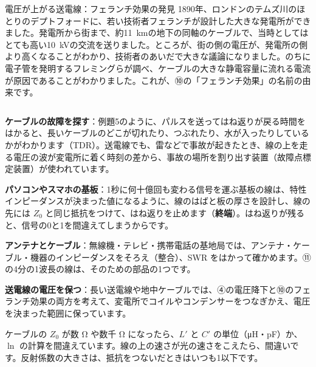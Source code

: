 \begin{column}{電圧が上がる送電線：フェランチ効果の発見}
1890年、ロンドンのテムズ川のほとりのデプトフォードに、若い技術者フェランチが設計した大きな発電所ができました。発電所から街まで、約\qty{11}{km}の地下の同軸のケーブルで、当時としてはとても高い\qty{10}{kV}の交流を送りました。ところが、街の側の電圧が、発電所の側より高くなることがわかり、技術者のあいだで大きな議論になりました。のちに電子管を発明するフレミングらが調べ、ケーブルの大きな静電容量に流れる電流が原因であることがわかりました。これが、⑩の「フェランチ効果」の名前の由来です。
\end{column}

\begin{phkougaku}
\textbf{ケーブルの故障を探す}：例題5のように、パルスを送ってはね返りが戻る時間をはかると、長いケーブルのどこが切れたり、つぶれたり、水が入ったりしているかがわかります（TDR）。送電線でも、雷などで事故が起きたとき、線の上を走る電圧の波が変電所に着く時刻の差から、事故の場所を割り出す装置（故障点標定装置）が使われています。

\textbf{パソコンやスマホの基板}：1秒に何十億回も変わる信号を運ぶ基板の線は、特性インピーダンスが決まった値になるように、線のはばと板の厚さを設計し、線の先には $Z_0$ と同じ抵抗をつけて、はね返りを止めます（\textbf{終端}）。はね返りが残ると、信号の0と1を間違えてしまうからです。

\textbf{アンテナとケーブル}：無線機・テレビ・携帯電話の基地局では、アンテナ・ケーブル・機器のインピーダンスをそろえ（整合）、SWR をはかって確かめます。⑪の4分の1波長の線は、そのための部品の1つです。

\textbf{送電線の電圧を保つ}：長い送電線や地中ケーブルでは、④の電圧降下と⑩のフェランチ効果の両方を考えて、変電所でコイルやコンデンサーをつなぎかえ、電圧を決まった範囲に保っています。

\begin{phketa}[線の数の目安]
ケーブルの $Z_0$ が数 Ω や数千 Ω になったら、$L'$ と $C'$ の単位（\si{\micro H}・pF）か、$\ln$ の計算を間違えています。線の上の速さが光の速さをこえたら、間違いです。反射係数の大きさは、抵抗をつないだときはいつも1以下です。
\end{phketa}
\end{phkougaku}

